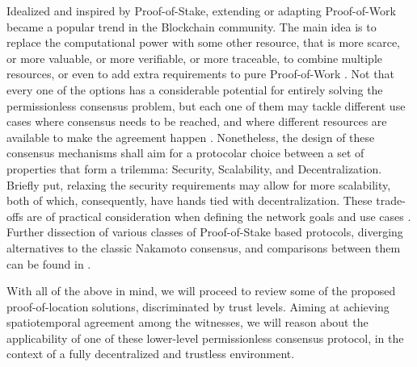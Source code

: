 Idealized and inspired by Proof-of-Stake, extending or adapting Proof-of-Work became a popular trend in the Blockchain community. The main idea is to replace the computational power with some other resource, that is more scarce, or more valuable, or more verifiable, or more traceable, to combine multiple resources, or even to add extra requirements to pure Proof-of-Work \cite{survey-dist-consensus}. Not that every one of the options has a considerable potential for entirely solving the permissionless consensus problem, but each one of them may tackle different use cases where consensus needs to be reached, and where different resources are available to make the agreement happen \cite{BOURAGA2021114384, 9376868}. Nonetheless, the design of these consensus mechanisms shall aim for a protocolar choice between a set of properties that form a trilemma: Security, Scalability, and Decentralization. Briefly put, relaxing the security requirements may allow for more scalability, both of which, consequently, have hands tied with decentralization. These trade-offs are of practical consideration when defining the network goals and use cases \cite{survey-dist-consensus}. Further dissection of various classes of Proof-of-Stake based protocols, diverging alternatives to the classic Nakamoto consensus, and comparisons between them can be found in \cite{8629877, survey-dist-consensus, BOURAGA2021114384, 9376868, natoli2019deconstructing}.

With all of the above in mind, we will proceed to review some of the proposed proof-of-location solutions, discriminated by trust levels. Aiming at achieving spatiotemporal agreement among the witnesses, we will reason about the applicability of one of these lower-level permissionless consensus protocol, in the context of a fully decentralized and trustless environment.